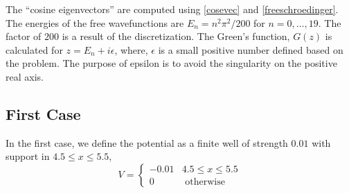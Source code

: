 \documentclass[a4paper,10pt]{report}
\begin{document}
The ``cosine eigenvectors'' are computed using \eqref{cosevec} and \eqref{freeschroedinger}.
The energies of the free wavefunctions are $E_n = n^2\pi^2/200$ for $n=0,\ldots,19$. The factor
of $200$ is a result of the discretization. The Green's function, $G(z)$ is calculated for $z=E_n+i\epsilon$,
where, $\epsilon$ is a small positive number defined based on the problem. The purpose of epsilon is to avoid 
the singularity on the positive real axis.

\subsection{First Case}
In the first case, we define the potential as a finite well of strength $0.01$ with support in $4.5 \leq x \leq 5.5$,
\begin{equation}\label{potentialdef1}
V = \begin{cases}
-0.01 &\mbox{} 4.5\leq x\leq 5.5\\
0 &\mbox{ otherwise}
\end{cases} 
\end{equation}
\end{document}
